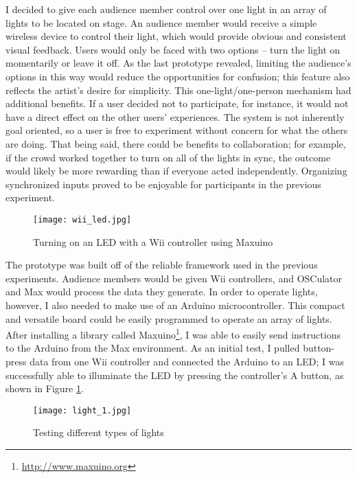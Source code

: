 I decided to give each audience member control over one light in an array of lights to be located on stage. An audience member would receive a simple wireless device to control their light, which would provide obvious and consistent visual feedback. Users would only be faced with two options -- turn the light on momentarily or leave it off. As the last prototype revealed, limiting the audience's options in this way would reduce the opportunities for confusion; this feature also reflects the artist's desire for simplicity. This one-light/one-person mechanism had additional benefits. If a user decided not to participate, for instance, it would not have a direct effect on the other users' experiences. The system is not inherently goal oriented, so a user is free to experiment without concern for what the others are doing. That being said, there could be benefits to collaboration; for example, if the crowd worked together to turn on all of the lights in sync, the outcome would likely be more rewarding than if everyone acted independently. Organizing synchronized inputs proved to be enjoyable for participants in the previous experiment.

\begin{figure}
	\centering

	\texttt{[image: wii\_led.jpg]}
	\caption{Turning on an LED with a Wii controller using Maxuino}

	\label{prototyping3.1}
\end{figure}

The prototype was built off of the reliable framework used in the previous experiments. Audience members would be given Wii controllers, and OSCulator and Max would process the data they generate. In order to operate lights, however, I also needed to make use of an Arduino microcontroller. This compact and versatile board could be easily programmed to operate an array of lights. After installing a library called Maxuino\footnote{\url{http://www.maxuino.org}}, I was able to easily send instructions to the Arduino from the Max environment. As an initial test, I pulled button-press data from one Wii controller and connected the Arduino to an LED; I was successfully able to illuminate the LED by pressing the controller's A button, as shown in Figure \ref{prototyping3.1}.

\begin{figure}
	\centering

	\texttt{[image: light\_1.jpg]}
	\caption{Testing different types of lights}

	\label{prototyping3.2}
\end{figure}


